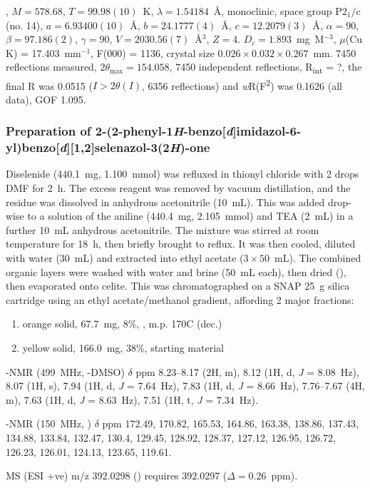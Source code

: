 \begin{refsection}
, $M=578.68$, $T=99.98(10)$~K, $\lambda=1.54184$~\AA, monoclinic, space group $\text{P}2_1/\text{c}$ (no. 14), $a = 6.93400(10)$~\AA, $b = 24.1777(4)$~\AA, $c = 12.2079(3)$~\AA, $\alpha = 90$\degree, $\beta = 97.186(2)$\degree, $\gamma = 90$\degree, $V = 2030.56(7)$~\AA$^{3}$, $Z = 4$. $D_{c}= 1.893$~mg~M$^{-3}$, $\mu$(Cu K\a) = 17.403~mm$^{-1}$, F(000) = 1136, crystal size $0.026 \times 0.032 \times 0.267$~mm. 7450 reflections measured, $2\theta_{\max}=154.058$\degree, 7450 independent reflections, R\textsubscript{int} = ?, the final R was 0.0515 ($I > 2\theta(I)$, 6356 reflections) and \emph{w}R(F\textsuperscript{2}) was 0.1626 (all data), GOF 1.095. 

\subsubsection[Preparation of \refcmpd{ebs-rhs-ph}]{Preparation of 2-(2-phenyl-1\emph{H}-benzo[\emph{d}]imidazol-6-yl)benzo[\emph{d}][1,2]\-selenazol-3(2\emph{H})-one }
Diselenide  (440.1~mg, 1.100~mmol) was refluxed in thionyl chloride with 2 drops DMF for 2~h.
The excess reagent was removed by vacuum distillation, and the residue was dissolved in anhydrous acetonitrile (10~mL).
This was added drop-wise to a solution of the aniline  (440.4~mg, 2.105~mmol) and TEA (2~mL) in a further 10~mL anhydrous acetonitrile.
The mixture was stirred at room temperature for 18~h, then briefly brought to reflux.
It was then cooled, diluted with water (30~mL) and extracted into ethyl acetate ($3\times50$~mL).
The combined organic layers were washed with water and brine (50~mL each), then dried (), then evaporated onto celite.
This was chromatographed on a SNAP 25~g silica cartridge using an ethyl acetate/methanol gradient, affording 2 major fractions:
\begin{enumerate}
    \item orange solid, 67.7~mg, 8\%, , m.p. 170\degree{}C (dec.)
    \item yellow solid, 166.0~mg, 38\%, starting material 
\end{enumerate}

-NMR (499~MHz, -DMSO) $\delta$ ppm 8.23--8.17 (2H, m), 8.12 (1H, d, \emph{J} = 8.08~Hz), 8.07 (1H, s), 7.94 (1H, d, \emph{J} = 7.64~Hz), 7.83 (1H, d, \emph{J} = 8.66~Hz), 7.76--7.67 (4H, m), 7.63 (1H, d, \emph{J} = 8.63~Hz), 7.51 (1H, t, \emph{J} = 7.34~Hz).

-NMR (150~MHz, ) $\delta$ ppm 172.49, 170.82, 165.53, 164.86, 163.38, 138.86, 137.43, 134.88, 133.84, 132.47, 130.4, 129.45, 128.92, 128.37, 127.12, 126.95, 126.72, 126.23, 126.01, 124.13, 123.65, 119.61.

MS (ESI +ve) m/z 392.0298 ()  requires 392.0297 ($\Delta=0.26$~ppm).

\printbibliography[heading=subbibliography]
\end{refsection}
